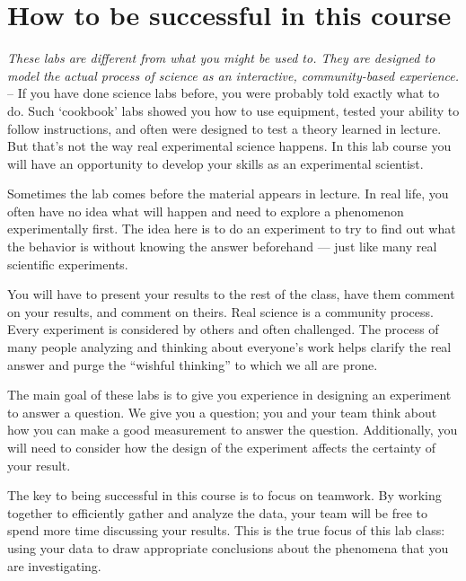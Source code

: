\section*{How to be successful in this course}
\emph{These labs are different from what you might be used to.
They are designed to model the actual process of science as an interactive, community-based experience.} --
If you have done science labs before, you were probably told exactly what to do.
Such `cookbook' labs showed you how to use equipment, tested your ability to follow instructions, and often were designed to test a theory learned in lecture.
But that's not the way real experimental science happens.
In this lab course you will have an opportunity to develop your skills as an experimental scientist. 
\par
Sometimes the lab comes before the material appears in lecture.
In real life, you often have no idea what will happen and need to explore a phenomenon experimentally first.
The idea here is to do an experiment to try to find out what the behavior is without knowing the answer beforehand — just like many real scientific experiments.
\par
You will have to present your results to the rest of the class, have them comment on your results, and comment on theirs.
Real science is a community process.
Every experiment is considered by others and often challenged.
The process of many people analyzing and thinking about everyone's work helps clarify the real answer and purge the ``wishful thinking'' to which we all are prone.
\par 
The main goal of these labs is to give you experience in designing an experiment to answer a question.
We give you a question; you and your team think about how you can make a good measurement to answer the question.
Additionally, you will need to consider how the design of the experiment affects the certainty of your result.
\par
The key to being successful in this course is to focus on teamwork.
By working together to efficiently gather and analyze the data, your team will be free to spend more time discussing your results.
This is the true focus of this lab class: using your data to draw appropriate conclusions about the phenomena that you are investigating.
